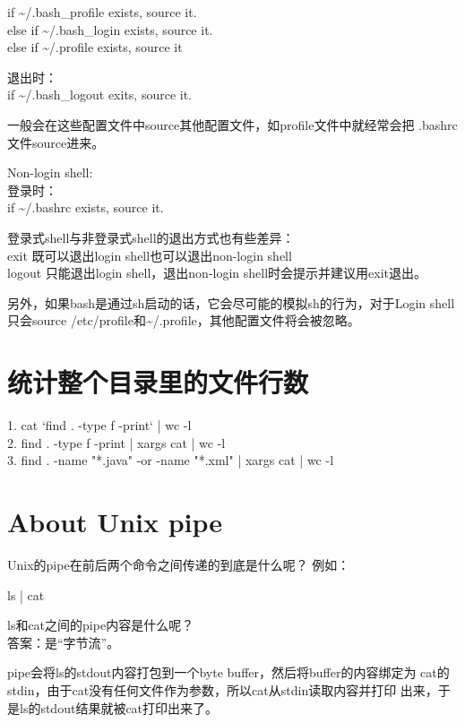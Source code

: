 ﻿\documentclass[a4paper,11pt]{article}
\begin{document}
  if \~{}/.bash\_profile exists, source it.\\
  else if \~{}/.bash\_login exists, source it.\\
  else if \~{}/.profile exists, source it

  退出时：\\
  if \~{}/.bash\_logout exits, source it.

  一般会在这些配置文件中source其他配置文件，如profile文件中就经常会把
  .bashrc文件source进来。

  Non-login shell:\\
  登录时：\\
  if \~{}/.bashrc exists, source it.

  登录式shell与非登录式shell的退出方式也有些差异：\\

  exit 既可以退出login shell也可以退出non-login shell\\
  logout 只能退出login shell，退出non-login shell时会提示并建议用exit退出。

  另外，如果bash是通过sh启动的话，它会尽可能的模拟sh的行为，对于Login shell
  只会source /etc/profile和\~{}/.profile，其他配置文件将会被忽略。


  \section[统计整个目录里的文件行数]{统计整个目录里的文件行数}
  1. cat `find . -type f -print` | wc -l\\
  2. find . -type f -print | xargs cat | wc -l\\
  3. find . -name "*.java" -or -name "*.xml" | xargs cat | wc -l

  \section[About Unix Pipe]{About Unix pipe}
  Unix的pipe在前后两个命令之间传递的到底是什么呢？
  例如：

  \begin{bashcode}
    ls | cat
  \end{bashcode}

  ls和cat之间的pipe内容是什么呢？\\
  答案：是“字节流”。

  pipe会将ls的stdout内容打包到一个byte buffer，然后将buffer的内容绑定为
  cat的stdin，由于cat没有任何文件作为参数，所以cat从stdin读取内容并打印
  出来，于是ls的stdout结果就被cat打印出来了。
\end{document}
